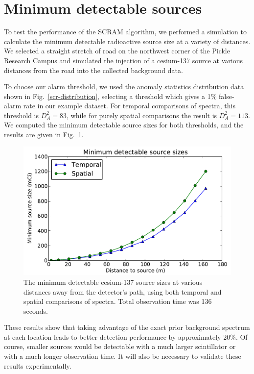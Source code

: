 \section{Minimum detectable sources}

To test the performance of the SCRAM algorithm, we performed a simulation to
calculate the minimum detectable radioactive source size at a variety of
distances. We selected a straight stretch of road on the northwest corner of the
Pickle Research Campus and simulated the injection of a cesium-137 source at
various distances from the road into the collected background data.

To choose our alarm threshold, we used the anomaly statistics distribution data
shown in Fig.~\ref{scr-distribution}, selecting a threshold which gives a 1\%
false-alarm rate in our example dataset. For temporal comparisons of spectra,
this threshold is \(D_A^2 = 83\), while for purely spatial comparisons the
result is \(D_A^2 = 113\). We computed the minimum detectable source sizes for
both thresholds, and the results are given in Fig.~\ref{minimum-detectable}.

\begin{figure}
  \centering
  \includegraphics[width=\textwidth]{figures/minimum-detectable.pdf}
  \caption{The minimum detectable cesium-137 source sizes at various distances
    away from the detector's path, using both temporal and spatial comparisons
    of spectra. Total observation time was 136 seconds.}
  \label{minimum-detectable}
\end{figure}

These results show that taking advantage of the exact prior background spectrum
at each location leads to better detection performance by approximately 20\%. Of
course, smaller sources would be detectable with a much larger scintillator or
with a much longer observation time. It will also be necessary to validate these
results experimentally.

